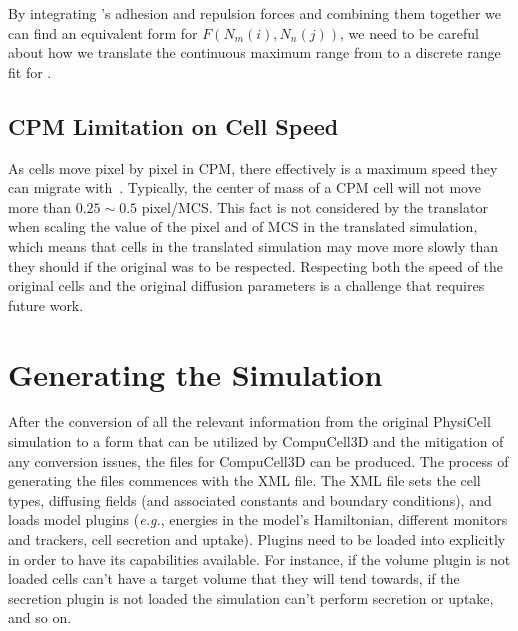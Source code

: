 By integrating \psc's adhesion and repulsion forces and combining them together we can find an equivalent form for $F\left(N_m (i), N_n(j) \right)$, we need to be careful about how we translate the continuous maximum range from \pscs to a discrete range fit for \ccd. 


\subsection{CPM Limitation on Cell Speed}\label{sec:trans:chal:speed}
As cells move pixel by pixel in CPM, there effectively is a maximum speed they can migrate with~\cite{szabo2013cellular}. Typically, the center of mass of a CPM cell will not move more than $0.25\sim0.5$ pixel/MCS. This fact is not considered by the translator when scaling the value of the pixel and of MCS in the translated simulation, which means that cells in the translated simulation may move more slowly than they should if the original \pscs was to be respected. Respecting both the speed of the original cells and the original diffusion parameters is a challenge that requires future work.



\section{Generating the \ccds Simulation}\label{sec:trans:gen}


After the conversion of all the relevant information from the original PhysiCell simulation to a form that can be utilized by CompuCell3D and the mitigation of any conversion issues, the files for CompuCell3D can be produced. The process of generating the files commences with the XML file. The XML file sets the cell types, diffusing fields (and associated constants and boundary conditions), and loads model plugins (\textit{e.g.}, energies in the model's Hamiltonian, different monitors and trackers, cell secretion and uptake).
Plugins need to be loaded into \ccds explicitly in order to have its capabilities available. For instance, if the volume plugin is not loaded cells can't have a target volume that they will tend towards, if the secretion plugin is not loaded the simulation can't perform secretion or uptake, and so on.

